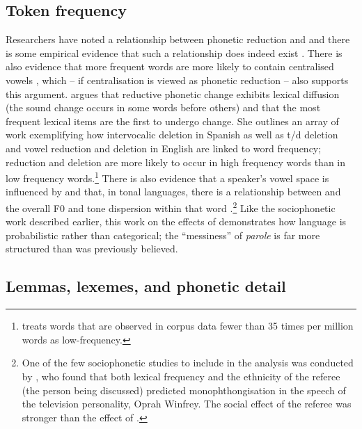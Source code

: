	\subsection{Token frequency}\label{sec:frequency}
Researchers have noted a relationship between phonetic reduction and  \citep{bybee2001,zipf1929} and there is some empirical evidence that such a relationship does indeed exist \citep{aylettturk2004,bakerbradlow2009,belletal2009}. There is also evidence that more frequent words are more likely to contain centralised vowels \citep{aylettturk2006,munsonsolomon2004}, which -- if centralisation is viewed as phonetic reduction -- also supports this argument. \citet{bybee2002} argues that reductive phonetic change exhibits lexical diffusion (the sound change occurs in some words before others) and that the most frequent lexical items are the first to undergo change. She outlines an array of work exemplifying how intervocalic  deletion in Spanish as well as t/d deletion and vowel reduction and deletion in English are linked to word frequency; reduction and deletion are more likely to occur in high frequency words than in low frequency words.\footnote{\citet{bybee2002} treats words that are observed in corpus data fewer than 35 times per million words as low-frequency.} There is also evidence that a speaker's vowel space is influenced by  \citep{munson2007} and that, in tonal languages, there is a relationship between  and the overall F0 and tone dispersion within that word \citep{zhaojurafsky2007}.\footnote{One of the few sociophonetic studies to include  in the analysis was conducted by \citet{oprah1999}, who found that both lexical frequency and the ethnicity of the referee (the person being discussed) predicted  monophthongisation in the speech of the television personality, Oprah Winfrey. The social effect of the referee was stronger than the effect of .} Like the sociophonetic work described earlier, this work on the effects of  demonstrates how language is probabilistic rather than categorical; the ``messiness'' of \textit{parole} is far more structured than was previously believed.



	\subsection{Lemmas, lexemes, and phonetic detail}
	
